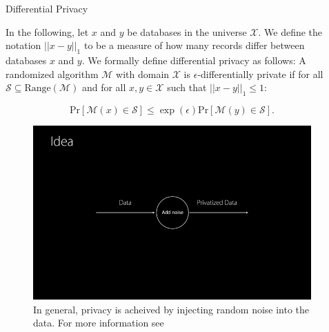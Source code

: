\documentclass[final]{beamer}
\newlength{\onecolwid}
\newlength{\twocolwid}
\begin{document}
\begin{frame}[t]
\begin{columns}[t]
\begin{column}{\twocolwid}
\begin{columns}[t,totalwidth=\twocolwid]
\begin{column}{\onecolwid}

\begin{block}{Differential Privacy}

In the following, let $x$ and $y$ be databases in the universe $\mathcal{X}$. We define the notation $||x-y||_1$ to be a measure of how many records differ between databases $x$ and $y$. We formally define differential privacy as follows:
A randomized algorithm $\mathcal{M}$ with domain $\mathcal{X}$ is $\epsilon$-differentially private if for all $\mathcal{S}\subseteq \text{Range}(\mathcal{M})$ and for all $x,y \in\mathcal{X}$ such that $||x - y||_1 \leq 1$:

\[
\text{Pr}[\mathcal{M}(x) \in \mathcal{S}] \leq \exp(\epsilon) \text{Pr}[\mathcal{M}(y) \in \mathcal{S}].
\]


\begin{figure}
\includegraphics[width=1.0\linewidth]{diffpriv.png}
\caption{In general, privacy is acheived by injecting random noise into the data. For more information 
	see \cite{dwork2014algorithmic}}
\end{figure}

\end{block}


\end{column} %

\begin{column}{\onecolwid}\vspace{-.6in} %


\end{column}
\end{columns}
\end{column}
\end{columns}
\end{frame}
\end{document}
